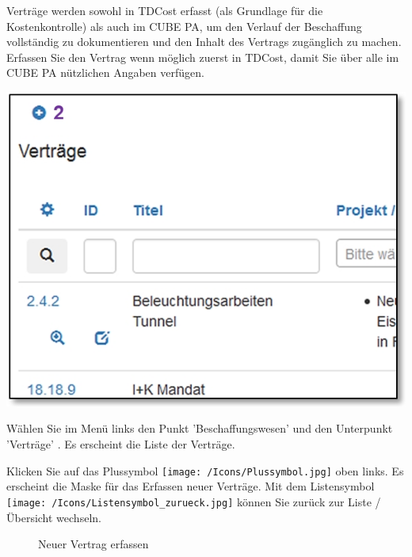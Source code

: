 Verträge werden sowohl in TDCost erfasst (als Grundlage für die Kostenkontrolle) als auch im CUBE PA, um den Verlauf der Beschaffung vollständig zu dokumentieren und den Inhalt des Vertrags zugänglich zu machen. Erfassen Sie den Vertrag wenn möglich zuerst in TDCost, damit Sie über alle im CUBE
PA nützlichen Angaben verfügen.

\begin{center}
\hspace{-55mm}   
\includegraphics[width=.4\linewidth]{../chapters/08_Beschaffungswesen/pictures/7-1-8_NeuerVertrag.jpg}
\end{center}

\vspace{\baselineskip}

Wählen Sie im Menü links den Punkt 'Beschaffungswesen' und den Unterpunkt 'Verträge' . Es erscheint die Liste der Verträge.

\vspace{\baselineskip}

Klicken Sie auf das Plussymbol \texttt{[image: /Icons/Plussymbol.jpg]}  oben links. Es erscheint die Maske für das Erfassen neuer Verträge. Mit dem Listensymbol \texttt{[image: /Icons/Listensymbol\_zurueck.jpg]}  können Sie zurück zur Liste / Übersicht wechseln.

\begin{figure}[H]
\caption{Neuer Vertrag erfassen}
\end{figure}

